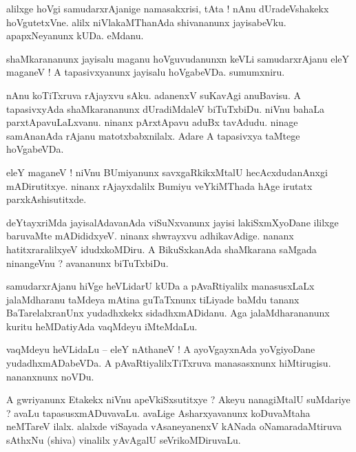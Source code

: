 \documentclass{article}
\begin{document}
\begin{mn}%
alilxge hoVgi samudarxrAjanige namasakxrisi, tAta ! nAnu dUradeVshakekx hoVgutetxVne. alilx 
niVlakaMThanAda shivananunx jayisabeVku. apapxNeyanunx kUDa. eMdanu.
\end{mn}

\begin{mn}%
shaMkarananunx jayisalu maganu hoVguvudanunxn keVLi samudarxrAjanu eleY maganeV ! A 
tapasivxyanunx jayisalu hoVgabeVDa. sumumxniru.
\end{mn}

\begin{mn}%
nAnu koTiTxruva rAjayxvu sAku. adanenxV suKavAgi anuBavisu. A tapasivxyAda shaMkarananunx 
dUradiMdaleV biTuTxbiDu. niVnu bahaLa parxtApavuLaLxvanu. ninanx pArxtApavu aduBx
tavAdudu. ninage samAnanAda rAjanu matotxbabxnilalx. Adare A tapasivxya taMtege hoVgabeVDa.
\end{mn}

\begin{mn}%
eleY maganeV ! niVnu BUmiyanunx savxgaRkikxMtalU hecAcxdudanAnxgi mADirutitxye. ninanx 
rAjayxdalilx Bumiyu veYkiMThada hAge irutatx parxkAshisutitxde.
\end{mn}

\begin{mn}%
deYtayxriMda jayisalAdavanAda viSuNxvanunx jayisi lakiSxmXyoDane ililxge baruvaMte 
mADididxyeV. ninanx shwrayxvu adhikavAdige. nananx hatitxraralilxyeV idudxkoMDiru. A 
BikuSxkanAda shaMkarana saMgada ninangeVnu ? avananunx biTuTxbiDu.
\end{mn}

\begin{mn}%
samudarxrAjanu hiVge heVLidarU kUDa a pAvaRtiyalilx manasusxLaLx jalaMdharanu taMdeya mAtina 
guTaTxnunx tiLiyade baMdu tananx BaTarelalxranUnx yudadhxkekx sidadhxmADidanu. Aga 
jalaMdharananunx kuritu heMDatiyAda vaqMdeyu iMteMdaLu.
\end{mn}

\begin{mn}%
vaqMdeyu heVLidaLu -- eleY nAthaneV ! A ayoVgayxnAda yoVgiyoDane yudadhxmADabeVDa. A 
pAvaRtiyalilxTiTxruva manasasxnunx hiMtirugisu. nananxnunx noVDu.
\end{mn}

\begin{mn}%
A gwriyanunx Etakekx niVnu apeVkiSxsutitxye ? Akeyu nanagiMtalU suMdariye ? avaLu 
tapasusxmADuvavaLu. avaLige Asharxyavanunx koDuvaMtaha neMTareV ilalx. alalxde viSayada 
vAsaneyanenxV kANada oNamaradaMtiruva sAthxNu (shiva) vinalilx yAvAgalU seVrikoMDiruvaLu.
\end{mn}
\end{document}
